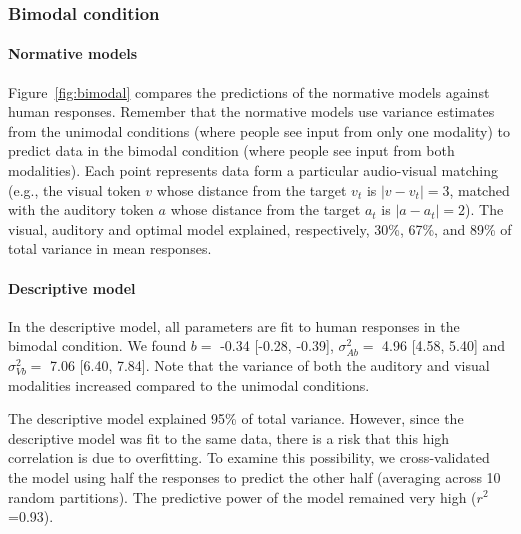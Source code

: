 \documentclass[english,floatsintext,man]{apa6}
\theoremstyle{definition}
\theoremstyle{definition}
\theoremstyle{definition}
\theoremstyle{remark}
\begin{document}
\subsubsection{Bimodal condition}\label{bimodal-condition-1}

\paragraph{Normative models}\label{normative-models}

Figure~\ref{fig:bimodal} compares the predictions of the normative
models against human responses. Remember that the normative models use
variance estimates from the unimodal conditions (where people see input
from only one modality) to predict data in the bimodal condition (where
people see input from both modalities). Each point represents data form
a particular audio-visual matching (e.g., the visual token \(v\) whose
distance from the target \(v_t\) is \(|v-v_t|=3\), matched with the
auditory token \(a\) whose distance from the target \(a_t\) is
\(|a-a_t|=2\)). The visual, auditory and optimal model explained,
respectively, 30\%, 67\%, and 89\% of total variance in mean responses.

\paragraph{Descriptive model}\label{descriptive-model}

In the descriptive model, all parameters are fit to human responses in
the bimodal condition. We found \(b=\) -0.34 {[}-0.28, -0.39{]},
\(\sigma^2_{Ab}=\) 4.96 {[}4.58, 5.40{]} and \(\sigma^2_{Vb}=\) 7.06
{[}6.40, 7.84{]}. Note that the variance of both the auditory and visual
modalities increased compared to the unimodal conditions.

\noindent The descriptive model explained 95\% of total variance.
However, since the descriptive model was fit to the same data, there is
a risk that this high correlation is due to overfitting. To examine this
possibility, we cross-validated the model using half the responses to
predict the other half (averaging across 10 random partitions). The
predictive power of the model remained very high (\(r^2\)=0.93).
\end{document}
